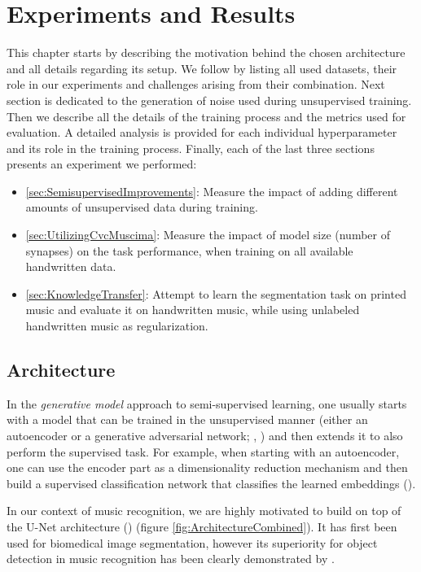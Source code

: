 \chapter{Experiments and Results}
\label{chap:ExperimentsAndResults}

This chapter starts by describing the motivation behind the chosen architecture and all details regarding its setup. We follow by listing all used datasets, their role in our experiments and challenges arising from their combination. Next section is dedicated to the generation of noise used during unsupervised training. Then we describe all the details of the training process and the metrics used for evaluation. A detailed analysis is provided for each individual hyperparameter and its role in the training process. Finally, each of the last three sections presents an experiment we performed:

\begin{itemize}
    \item \ref{sec:SemisupervisedImprovements}: Measure the impact of adding different amounts of unsupervised data during training.
    \item \ref{sec:UtilizingCvcMuscima}: Measure the impact of model size (number of synapses) on the task performance, when training on all available handwritten data.
    \item \ref{sec:KnowledgeTransfer}: Attempt to learn the segmentation task on printed music and evaluate it on handwritten music, while using unlabeled handwritten music as regularization.
\end{itemize}


\section{Architecture}
\label{sec:Architecture}

In the \emph{generative model} approach to semi-supervised learning, one usually starts with a model that can be trained in the unsupervised manner (either an autoencoder or a generative adversarial network; \cite{AutoencodersOverview}, \cite{GAN}) and then extends it to also perform the supervised task. For example, when starting with an autoencoder, one can use the encoder part as a dimensionality reduction mechanism and then build a supervised classification network that classifies the learned embeddings (\cite{KingmaSslVae}).

In our context of music recognition, we are highly motivated to build on top of the U-Net architecture (\cite{UNet}) (figure \ref{fig:ArchitectureCombined}). It has first been used for biomedical image segmentation, however its superiority for object detection in music recognition has been clearly demonstrated by \cite{PachaBaseline}.

